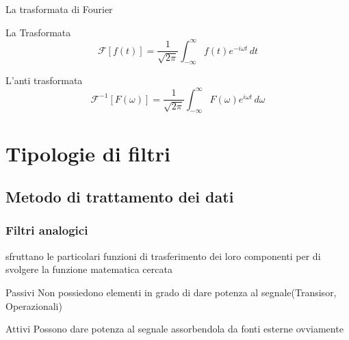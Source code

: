 		\begin{frame}{La trasformata di Fourier}
		
			\begin{block}{La Trasformata}
				\begin{equation}
					\mathcal{F} \left [ f \left ( t\right)\right ] =\frac{1}{\sqrt{2\pi}} \int_{-\infty}^{\infty} f \left ( t \right ) e^{-i \omega t} \, dt
				\end{equation}		
			\end{block}	

			\pause
			
			\begin{block}{L'anti trasformata}
				\begin{equation}
				    \label{eq:antitrasformata}
					\mathcal{F}^{-1} \left [ F \left ( \omega \right)\right ] =\frac{1}{\sqrt{2\pi}} \int_{-\infty}^{\infty} F \left ( \omega \right ) e^{i \omega t} \, d\omega
				\end{equation}
			\end{block}
		
		\end{frame}
		

	\section{Tipologie di filtri} %
	\label{sec:tipologie_costruttive_di_filtri}
		\subsection{Metodo di trattamento dei dati} %
		\label{sub:metodo_di_trattamento_dei_dati}

		\begin{frame}[c]\frametitle{Filtri analogici}
		    
				sfruttano le particolari funzioni di trasferimento dei loro componenti per di svolgere la funzione matematica cercata
				\pause
				\begin{block}{Passivi}
					Non possiedono elementi in grado di dare potenza al segnale(Transisor, Operazionali)
				\end{block}
				\pause
				\begin{block}{Attivi}
					Possono dare potenza al segnale assorbendola da fonti esterne ovviamente
				\end{block}
		
		\end{frame}


